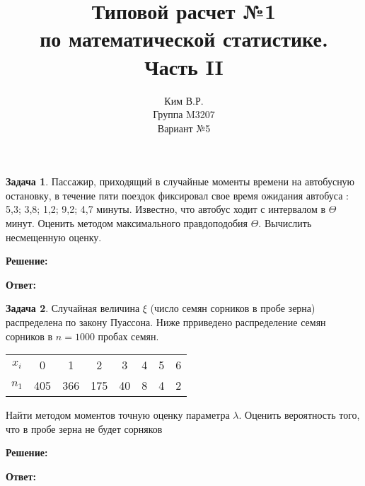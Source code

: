 \documentclass[a4paper,12pt]{article}
\title{Типовой расчет №1 \\ по математической статистике. \\ Часть II}
\author{Ким В.Р. \\ Группа M3207 \\ Вариант №5}
\date{}
\theoremstyle{definition}
\newtheorem{problem}{Задача}\setlength{\parindent}{0pt}
\newenvironment{solution}
{\begin{shaded}\textbf{Решение:}\par\setlength{\parindent}{0pt}}
{\end{shaded}}
\newenvironment{answer}
{\par\noindent\textbf{Ответ:} \color{blue}}
{\par}
\begin{document}
\maketitle

\begin{problem}
    Пассажир, приходящий в случайные моменты времени на автобусную остановку, в течение
    пяти поездок фиксировал свое время ожидания автобуса : 5,3; 3,8; 1,2; 9,2; 4,7 минуты.
    Известно, что автобус ходит с интервалом в \( \Theta \) минут. Оценить методом максимального
    правдоподобия \( \Theta \). Вычислить несмещенную оценку.

    \begin{solution}
    \end{solution}

    \begin{answer}
    \end{answer}

\end{problem}



\begin{problem}
    Случайная величина \( \xi \) (число семян сорников в пробе зерна) распределена по закону Пуассона.
    Ниже прриведено распределение семян сорников в \( n = 1000 \) пробах семян. 

    \begin{table}[H]
        \centering
        \begin{adjustbox}{max width=\textwidth}
            \begin{tabular}{c c c c c c c c}
                \toprule
                \midrule
                    \(x_i\) & 0   & 1   & 2   & 3  & 4 & 5 & 6 \\
                    \(n_1\) & 405 & 366 & 175 & 40 & 8 & 4 & 2 \\
            \bottomrule
            \end{tabular}
        \end{adjustbox}
    \end{table}  

    Найти методом моментов точную оценку параметра \( \lambda \). 
    Оценить вероятность того, что в пробе зерна не будет сорняков 

    \begin{solution}
    \end{solution}

    \begin{answer}
    \end{answer}

\end{problem}
\end{document}
